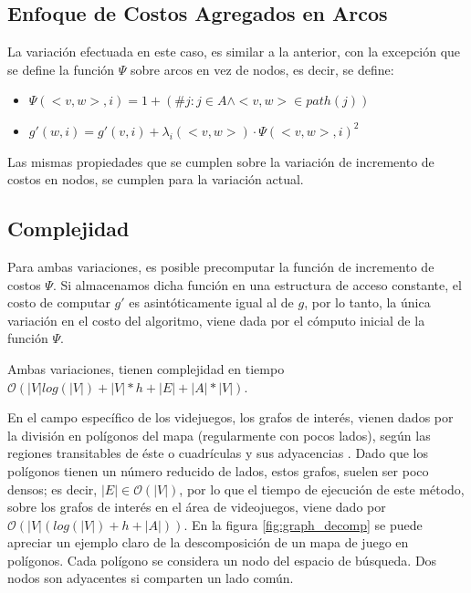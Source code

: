 \documentclass{egpubl}
\newcommand{\bigO}{\mathcal{O}}
\begin{document}
\subsection{Enfoque de Costos Agregados en Arcos}

La variación efectuada en este caso, es similar a la anterior,
con la excepción que se define la función $\Psi$ sobre arcos
en vez de nodos, es decir, se define:

\begin{itemize}
\item $\Psi(<v,w>,i) = 1+(\# j : j \in A \wedge <v,w> \in path(j))$
\item $g'(w, i) = g'(v,i) + \lambda_i(<v,w>) \cdot \Psi(<v,w>,i)^2$
\end{itemize}

Las mismas propiedades que se cumplen sobre la variación
de incremento de costos en nodos, se cumplen para la variación
actual.

\subsection{Complejidad}

Para ambas variaciones, es posible precomputar la función de
incremento de costos $\Psi$. Si almacenamos dicha función en
una estructura de acceso constante, el costo de computar $g'$
es asintóticamente igual al de $g$, por lo tanto, la única
variación en el costo del algoritmo, viene dada por el
cómputo inicial de la función $\Psi$.

Ambas variaciones, tienen complejidad en tiempo
$\bigO(|V|log(|V|) + |V|*h + |E| + |A|*|V| )$.

En el campo específico de los videjuegos, los grafos
de interés, vienen dados por la división en polígonos
del mapa
\cite{MF09} \cite{CS11}
(regularmente con pocos lados), según las
regiones transitables de éste o cuadrículas y sus
adyacencias \cite{MF09} \cite{CS11}.
Dado que los polígonos tienen un número
reducido de lados, estos grafos, suelen ser poco densos;
es decir, $|E| \in \bigO(|V|)$, por lo que el tiempo
de ejecución de este método, sobre los grafos de interés
en el área de videojuegos, viene dado por
$\bigO(|V|(log(|V|) + h + |A|) )$. En la figura
\ref{fig:graph_decomp} se puede apreciar un ejemplo
claro de la descomposición de un mapa de juego en polígonos.
Cada polígono se considera un nodo del espacio de búsqueda.
Dos nodos son adyacentes si comparten un lado común.
\end{document}

